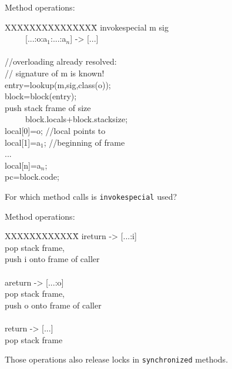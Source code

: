 \begin{slide*}
Method operations:\\
 
\begin{tt}
\begin{tabbing}
XXXXXXXXXXXXXXX\=\kill
invokespecial m sig\\
~~~~~[...:o:a$_1$:...:a$_n$] -> [...]\\
\\
//overloading already resolved:\\
//   signature of m is known!\\
entry=lookup(m,sig,class(o));\\
block=block(entry);\\
push stack frame of size\\
~~~~~block.locals+block.stacksize;\\
local[0]=o; //local points to\\
local[1]=a$_1$;  //beginning of frame\\
...\\
local[n]=a$_n$;\\
pc=block.code;\\
\end{tabbing}
\end{tt}
For which method calls is {\tt invokespecial} used?
\vfil
\end{slide*}

\begin{slide*}
Method operations:\\
 
\begin{tt}
\begin{tabbing}
XXXXXXXXXXXX\=\kill
ireturn  \>[...:<frame>:i] -> [...:i]\\
         \>pop stack frame,\\
         \>push i onto frame of caller\\
\\
areturn  \>[...:<frame>:o] -> [...:o]\\
         \>pop stack frame,\\
         \>push o onto frame of caller\\
\\
return   \>[...:<frame>] -> [...]\\
         \>pop stack frame
\end{tabbing}
\end{tt}
\bigskip
Those operations also release locks in {\tt synchronized} methods.
\vfil
\end{slide*}

